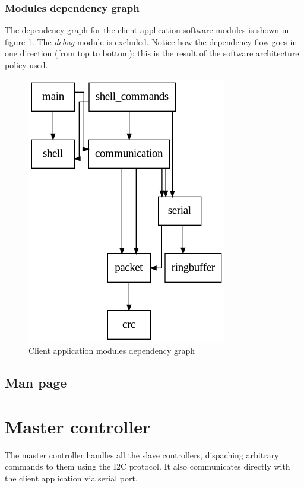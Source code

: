 \documentclass[binding=0.6cm,Lau]{sapthesis}
\makeatletter
\def\maxwidth#1{\ifdim\Gin@nat@width>#1 #1\else\Gin@nat@width\fi}
\makeatother
\begin{document}
\subsection{Modules dependency graph}
The dependency graph for the client application software modules is shown in
figure \ref{img:client-deps-graph}. The \emph{debug} module is excluded. Notice
how the dependency flow goes in one direction (from top to bottom); this is the
result of the software architecture policy used.
\begin{figure}[hbp]
\begin{centering}
  \includegraphics[width=\maxwidth{\textwidth}]{img/client-deps}
  \caption{Client application modules dependency graph}
  \label{img:client-deps-graph}
\end{centering}
\end{figure}

\section{Man page}
\label{sec:client-manpage}


\chapter{Master controller}
\label{ch:master}
The master controller handles all the slave controllers, dispaching arbitrary
commands to them using the I2C protocol. It also communicates directly with the
client application via serial port.
\end{document}
